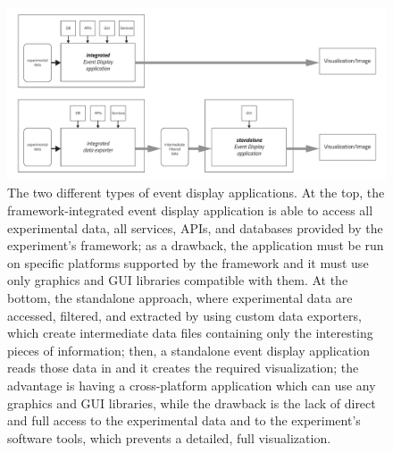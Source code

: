 \documentclass[12pt,a4paper]{article}
\begin{document}
\begin{figure}
	\centering
	\includegraphics[width=\linewidth]{img/eventDisplays_applications_types}
	\caption[Different types of event display applications]{The two different types of event display applications. At the top,
	the framework-integrated event display application is able to access all experimental data, all services, APIs, and databases
	provided by the experiment's framework; as a drawback, the application must be run on specific platforms supported by the
	framework and it must use only graphics and GUI libraries compatible with them. At the bottom, the standalone approach, where
	experimental data are accessed, filtered, and extracted by using custom data exporters, which create intermediate data files
	containing only the interesting pieces of information; then, a standalone event display application reads those data in and it
	creates the required visualization; the advantage is having a cross-platform application which can use any graphics and GUI libraries,
	while the drawback is the lack of direct and full access to the experimental data and to the experiment's software tools,
	which prevents a detailed, full visualization.}
	\label{fig:eventdisplaysapplicationstypes}
\end{figure}


\end{document}
